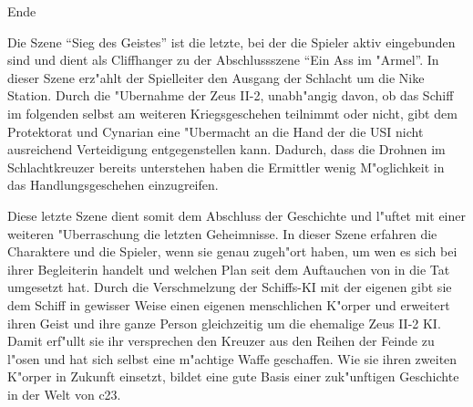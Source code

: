 \begin{remarks}
	\begin{center}\huge{}Ende\end{center}

	Die Szene "`Sieg des Geistes"' ist die letzte, bei der die Spieler aktiv eingebunden sind und dient als Cliffhanger zu der Abschlussszene "`Ein Ass im "Armel"'. In dieser Szene erz"ahlt der Spielleiter den Ausgang der Schlacht um die Nike Station.    
    Durch die "Ubernahme der Zeus II-2, unabh"angig davon, ob das Schiff im folgenden selbst am weiteren Kriegsgeschehen teilnimmt oder nicht, gibt dem Protektorat und Cynarian eine "Ubermacht an die Hand der die USI nicht ausreichend Verteidigung entgegenstellen kann. Dadurch, dass die Drohnen im Schlachtkreuzer bereits \xl{} unterstehen haben die Ermittler wenig M"oglichkeit in das Handlungsgeschehen einzugreifen.

	Diese letzte Szene dient somit dem Abschluss der Geschichte und l"uftet mit einer weiteren "Uberraschung die letzten Geheimnisse. In dieser Szene erfahren die Charaktere und die Spieler, wenn sie genau zugeh"ort haben, um wen es sich bei ihrer Begleiterin handelt und welchen Plan \xl{} seit dem Auftauchen von \ml{} in die Tat umgesetzt hat. Durch die Verschmelzung der Schiffs-KI mit der eigenen gibt sie dem Schiff in gewisser Weise einen eigenen menschlichen K"orper und erweitert ihren Geist und ihre ganze Person gleichzeitig um die ehemalige Zeus II-2 KI. Damit erf"ullt sie ihr versprechen den Kreuzer aus den Reihen der Feinde zu l"osen und hat sich selbst eine m"achtige Waffe geschaffen. Wie sie ihren zweiten K"orper in Zukunft einsetzt, bildet eine gute Basis einer zuk"unftigen Geschichte in der Welt von c23.
\end{remarks}
